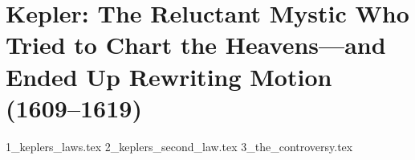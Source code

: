 \section{Kepler: The Reluctant Mystic Who Tried to Chart the Heavens—and Ended Up Rewriting Motion (1609–1619)}

{1_keplers_laws.tex}
{2_keplers_second_law.tex}
{3_the_controversy.tex}